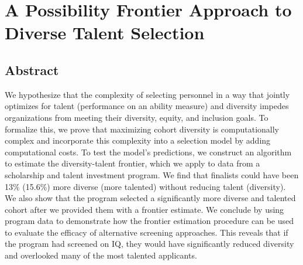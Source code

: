 

\chapter{\label{ch:spf}A Possibility Frontier Approach to Diverse Talent Selection}

\minitoc

\section{Abstract}
We hypothesize that the complexity of selecting personnel in a way that jointly optimizes for talent (performance on an ability measure) and diversity impedes organizations from meeting their diversity, equity, and inclusion goals. To formalize this, we prove that maximizing cohort diversity is computationally complex and incorporate this complexity into a selection model by adding computational costs. To test the model's predictions, we construct an algorithm to estimate the diversity-talent frontier, which we apply to data from a scholarship and talent investment program. We find that finalists could have been 13\% (15.6\%) more diverse (more talented) without reducing talent (diversity). We also show that the program selected a significantly more diverse and talented cohort after we provided them with a frontier estimate. We conclude by using program data to demonstrate how the frontier estimation procedure can be used to evaluate the efficacy of alternative screening approaches. This reveals that if the program had screened on IQ, they would have significantly reduced diversity and overlooked many of the most talented applicants.


